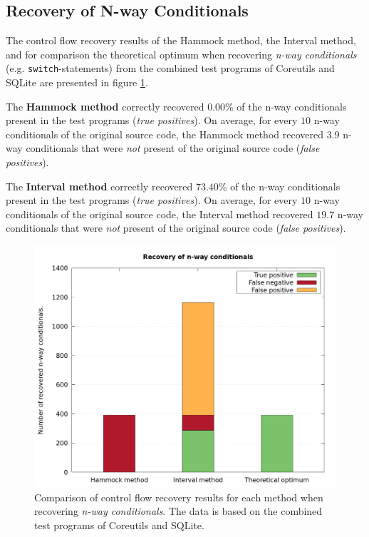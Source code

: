 
\subsection{Recovery of N-way Conditionals}
\label{sec:recovery_of_nway_conditionals}

The control flow recovery results of the Hammock method, the Interval method, and for comparison the theoretical optimum when recovering \textit{n-way conditionals} (e.g. \texttt{switch}-statements) from the combined test programs of Coreutils and SQLite are presented in figure \ref{fig:total_results_nway}.

The \textbf{Hammock method} correctly recovered $0.00\%$ of the n-way conditionals present in the test programs (\textit{true positives}). On average, for every $10$ n-way conditionals of the original source code, the Hammock method recovered $3.9$ n-way conditionals that were \textit{not} present of the original source code (\textit{false positives}).

The \textbf{Interval method} correctly recovered $73.40\%$ of the n-way conditionals present in the test programs (\textit{true positives}). On average, for every $10$ n-way conditionals of the original source code, the Interval method recovered $19.7$ n-way conditionals that were \textit{not} present of the original source code (\textit{false positives}).

\begin{figure}[htbp]
	\centering
	\includegraphics[width=\textwidth]{inc/5_results/results_n-way.png}
	\caption{Comparison of control flow recovery results for each method when recovering \textit{n-way conditionals}. The data is based on the combined test programs of Coreutils and SQLite.}
	\label{fig:total_results_nway}
\end{figure}
